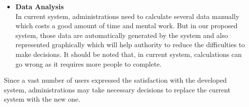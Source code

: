 \begin{itemize}
\item \textbf{Data Analysis}\\
In current system, administrations need to calculate several data manually which costs a good amount of time and mental work. But in our proposed system, those data are automatically generated by the system and also represented graphically which will help authority to reduce the difficulties to make decisions. It should be noted that, in current system, calculations can go wrong as it requires more people to complete.


\end{itemize}

Since a vast number of users expressed the satisfaction with the developed system, administrations may take necessary decisions to replace the current system with the new one.
 
\clearpage